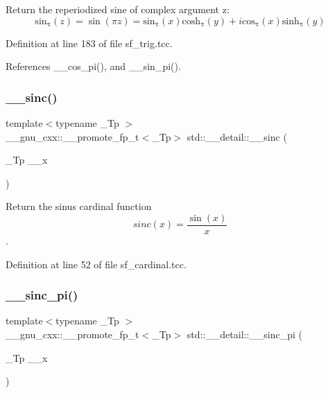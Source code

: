 Return the reperiodized sine of complex argument z\+: \[ \mathrm{sin_\pi}(z) = \sin(\pi z) = \mathrm{sin_\pi}(x) \mathrm{cosh_\pi}(y) + i \mathrm{cos_\pi}(x) \mathrm{sinh_\pi}(y) \] 

Definition at line 183 of file sf\+\_\+trig.\+tcc.



References \+\_\+\+\_\+cos\+\_\+pi(), and \+\_\+\+\_\+sin\+\_\+pi().

\mbox{\label{namespacestd_1_1____detail_aa7bdd4dd998288441b84ca2e142a4a04}} 
\subsubsection{\texorpdfstring{\+\_\+\+\_\+sinc()}{\_\_sinc()}}
{\footnotesize\ttfamily template$<$typename \+\_\+\+Tp $>$ \\
\+\_\+\+\_\+gnu\+\_\+cxx\+::\+\_\+\+\_\+promote\+\_\+fp\+\_\+t$<$\+\_\+\+Tp$>$ std\+::\+\_\+\+\_\+detail\+::\+\_\+\+\_\+sinc (\begin{DoxyParamCaption}\item[{\+\_\+\+Tp}]{\+\_\+\+\_\+x }\end{DoxyParamCaption})}



Return the sinus cardinal function \[ sinc(x) = \frac{\sin(x)}{x} \]. 



Definition at line 52 of file sf\+\_\+cardinal.\+tcc.

\mbox{\label{namespacestd_1_1____detail_accfe65ec3790f60b0b429afbd4000bb1}} 
\subsubsection{\texorpdfstring{\+\_\+\+\_\+sinc\+\_\+pi()}{\_\_sinc\_pi()}}
{\footnotesize\ttfamily template$<$typename \+\_\+\+Tp $>$ \\
\+\_\+\+\_\+gnu\+\_\+cxx\+::\+\_\+\+\_\+promote\+\_\+fp\+\_\+t$<$\+\_\+\+Tp$>$ std\+::\+\_\+\+\_\+detail\+::\+\_\+\+\_\+sinc\+\_\+pi (\begin{DoxyParamCaption}\item[{\+\_\+\+Tp}]{\+\_\+\+\_\+x }\end{DoxyParamCaption})}



